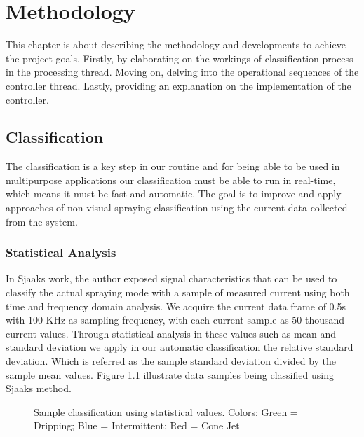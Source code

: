 \chapter{Methodology}
\label{chap:Methodology}

This chapter is about describing the methodology and developments to achieve the project goals. 
Firstly, by elaborating on the workings of classification process in the processing thread. Moving on, delving into the operational sequences of the controller thread. Lastly, providing an explanation on the implementation of the controller.


\section{Classification}
\label{sec:section_classification}

The classification is a key step in our routine and for being able to be used in multipurpose applications our classification must be able to run in real-time, which means it must be fast and automatic.
The goal is to improve and apply approaches of non-visual spraying classification using the current data collected from the system.

\subsection{Statistical Analysis}
In Sjaaks\cite{Sjaaks} work, the author exposed signal characteristics that can be used to classify the actual spraying mode with a sample of measured current using both time and frequency domain analysis.
We acquire the current data frame of 0.5s with 100 KHz as sampling frequency, with each current sample as 50 thousand current values. Through statistical analysis in these values such as mean and standard deviation we apply in our automatic classification the relative standard deviation. Which is referred as the sample standard deviation divided by the sample mean values. 
Figure \ref{fig:sjaaks_statistical_class} illustrate data samples being classified using Sjaaks method.

\begin{figure}[H]
    \centering
    \caption{Sample classification using statistical values. Colors: Green = Dripping; Blue = Intermittent; Red = Cone Jet}
    \label{fig:sjaaks_statistical_class}
\end{figure}

